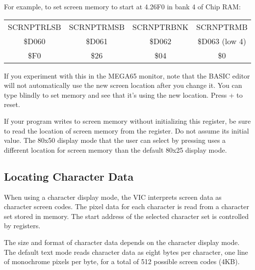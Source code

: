 For example, to set screen memory to start at 4.26F0 in bank 4 of Chip RAM:

\begin{center}
\begin{tabular}{|c|c|c|c|}
\hline
SCRNPTRLSB & SCRNPTRMSB & SCRNPTRBNK & SCRNPTRMB \\
\$D060 & \$D061 & \$D062 & \$D063 (low 4) \\
\hline
\$F0 & \$26 & \$04 & \$0 \\
\hline
\end{tabular}
\end{center}


If you experiment with this in the MEGA65 monitor, note that the BASIC editor
will not automatically use the new screen location after you change it. You can
type blindly to set memory and see that it's using the new location. Press
 +  to reset.

If your program writes to screen memory without initializing this register, be
sure to read the location of screen memory from the register. Do not assume
its initial value. The 80x50 display mode that the user can select by pressing
  uses a different location for screen memory
than the default 80x25 display mode.

\subsection{Locating Character Data}

When using a character display mode, the VIC interprets screen data as
character screen codes. The pixel data for each character is read from a
character set stored in memory. The start address of the selected character set
is controlled by registers.

The size and format of character data depends
on the character display mode. The default text mode reads character data as
eight bytes per character, one line of monochrome pixels per byte, for a total
of 512 possible screen codes (4KB).

